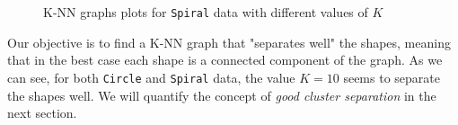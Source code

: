 \begin{figure}[H]
  \caption{K-NN graphs plots for \texttt{Spiral} data with different values of \(K\)}
  \label{KNN_spiral}
\end{figure}

Our objective is to find a K-NN graph that "separates well" the shapes, meaning that in the best case each shape is a connected component of the graph. As we can see, for both \texttt{Circle} and \texttt{Spiral} data, the value \(K = 10\) seems to separate the shapes well. We will quantify the concept of \textit{good cluster separation} in the next section.